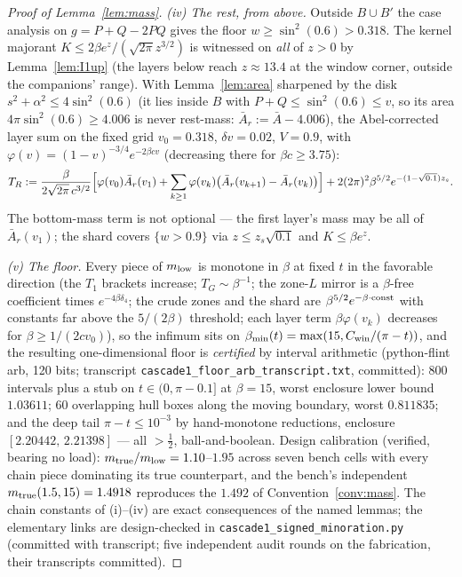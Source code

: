 \documentclass[11pt]{article}
\theoremstyle{remark}
\begin{document}
\begin{proof}[Proof of Lemma~\ref{lem:mass}]
\emph{(iv) The rest, from above.} Outside $B\cup B'$ the case
analysis on $g=P+Q-2PQ$ gives the floor $w\ge\sin^2(0.6)>0.318$.
The kernel majorant $K\le2\beta e^{z}/(\sqrt{2\pi}z^{3/2})$ is
witnessed on \emph{all} of $z>0$ by Lemma~\ref{lem:I1up}
\textup{(}the layers below reach $z\approx13.4$ at the window
corner, outside the companions' range\textup{)}. With
Lemma~\ref{lem:area} sharpened by the disk
$s^2+\alpha^2\le4\sin^2(0.6)$ \textup{(}it lies inside $B$ with
$P+Q\le\sin^2(0.6)\le v$, so its area
$4\pi\sin^2(0.6)\ge4.006$ is never rest-mass:
$\bar A_r:=\bar A-4.006$\textup{)}, the Abel-corrected layer sum on
the fixed grid $v_0=0.318$, $\delta v=0.02$, $V=0.9$, with
$\varphi(v)=(1-v)^{-3/4}e^{-2\beta cv}$ \textup{(}decreasing there
for $\beta c\ge3.75$\textup{)}:
\[
T_R:=\frac{\beta}{2\sqrt{2\pi}\,c^{3/2}}
\Bigl[\varphi(v_0)\bar A_r(v_1)+\sum_{k\ge1}\varphi(v_k)
\bigl(\bar A_r(v_{k+1})-\bar A_r(v_k)\bigr)\Bigr]
+2(2\pi)^2\beta^{5/2}e^{-(1-\sqrt{0.1})z_s}.
\]
The bottom-mass term is not optional --- the first layer's mass may
be all of $\bar A_r(v_1)$; the shard covers $\{w>0.9\}$ via
$z\le z_s\sqrt{0.1}$ and $K\le\beta e^{z}$.

\emph{(v) The floor.} Every piece of $m_{\rm low}$ is monotone in
$\beta$ at fixed $t$ in the favorable direction \textup{(}the $T_1$
brackets increase; $T_G\sim\beta^{-1}$; the zone-$L$ mirror is a
$\beta$-free coefficient times $e^{-4\beta\delta_4}$; the crude
zones and the shard are $\beta^{5/2}e^{-\beta\cdot{\rm const}}$
with constants far above the $5/(2\beta)$ threshold; each layer
term $\beta\varphi(v_k)$ decreases for
$\beta\ge1/(2cv_0)$\textup{)}, so the infimum sits on
$\beta_{\min}(t)=\max(15,C_{\rm win}/(\pi-t))$, and the resulting
one-dimensional floor is \emph{certified} by interval arithmetic
\textup{(}python-flint arb, 120 bits; transcript
\texttt{cascade1\_floor\_arb\_transcript.txt}, committed\textup{)}:
800 intervals plus a stub on $t\in(0,\pi-0.1]$ at $\beta=15$, worst
enclosure lower bound $1.03611$; 60 overlapping hull boxes along
the moving boundary, worst $0.811835$; and the deep tail
$\pi-t\le10^{-3}$ by hand-monotone reductions, enclosure
$[2.20442,\,2.21398]$ --- all $>\tfrac12$, ball-and-boolean.
Design calibration \textup{(}verified, bearing no load\textup{)}:
$m_{\rm true}/m_{\rm low}=1.10$--$1.95$ across seven bench cells
with every chain piece dominating its true counterpart, and the
bench's independent $m_{\rm true}(1.5,15)=1.4918$ reproduces the
$1.492$ of Convention~\ref{conv:mass}. The chain constants of
\textup{(i)}--\textup{(iv)} are exact consequences of the named
lemmas; the elementary links are design-checked in
\texttt{cascade1\_signed\_minoration.py} \textup{(}committed with
transcript; five independent audit rounds on the fabrication, their
transcripts committed\textup{)}.
\end{proof}
\end{document}
